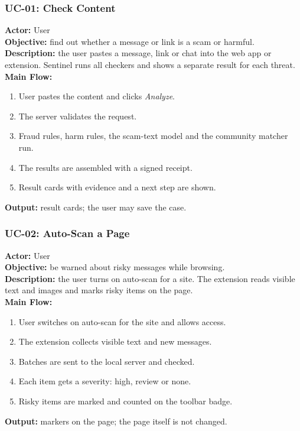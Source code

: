 \subsubsection*{UC-01: Check Content}
\noindent\textbf{Actor:} User\\
\textbf{Objective:} find out whether a message or link is a scam or harmful.\\
\textbf{Description:} the user pastes a message, link or chat into the web app or extension. Sentinel runs all checkers and shows a separate result for each threat.\\
\textbf{Main Flow:}
\begin{enumerate}
\item User pastes the content and clicks \emph{Analyze}.
\item The server validates the request.
\item Fraud rules, harm rules, the scam-text model and the community matcher run.
\item The results are assembled with a signed receipt.
\item Result cards with evidence and a next step are shown.
\end{enumerate}
\textbf{Output:} result cards; the user may save the case.

\subsubsection*{UC-02: Auto-Scan a Page}
\noindent\textbf{Actor:} User\\
\textbf{Objective:} be warned about risky messages while browsing.\\
\textbf{Description:} the user turns on auto-scan for a site. The extension reads visible text and images and marks risky items on the page.\\
\textbf{Main Flow:}
\begin{enumerate}
\item User switches on auto-scan for the site and allows access.
\item The extension collects visible text and new messages.
\item Batches are sent to the local server and checked.
\item Each item gets a severity: high, review or none.
\item Risky items are marked and counted on the toolbar badge.
\end{enumerate}
\textbf{Output:} markers on the page; the page itself is not changed.

